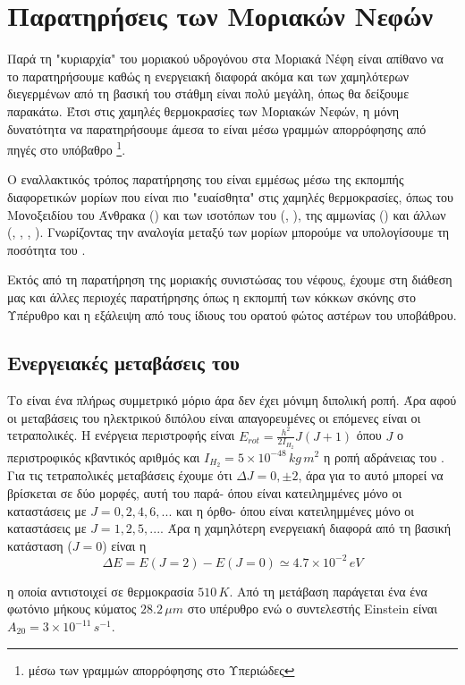 \documentclass[a4paper,11pt]{memoir}
\begin{document}
\section{Παρατηρήσεις των Μοριακών Νεφών}
\label{par:H2}
Παρά τη "κυριαρχία" του μοριακού υδρογόνου στα Μοριακά Νέφη είναι απίθανο να το παρατηρήσουμε καθώς η ενεργειακή διαφορά ακόμα και των χαμηλότερων διεγερμένων από τη βασική του στάθμη είναι πολύ μεγάλη, όπως θα δείξουμε παρακάτω. Έτσι στις χαμηλές θερμοκρασίες των Μοριακών Νεφών, η μόνη δυνατότητα να παρατηρήσουμε άμεσα το  είναι μέσω γραμμών απορρόφησης από πηγές στο υπόβαθρο \footnote{μέσω των γραμμών απορρόφησης στο Υπεριώδες}. 

Ο εναλλακτικός τρόπος παρατήρησης του  είναι εμμέσως μέσω της εκπομπής διαφορετικών μορίων που είναι πιο "ευαίσθητα" στις χαμηλές θερμοκρασίες, όπως του Μονοξειδίου του Άνθρακα () και των ισοτόπων του (, ), της αμμωνίας () και άλλων (, , , ).
Γνωρίζοντας την αναλογία μεταξύ των μορίων μπορούμε να υπολογίσουμε τη ποσότητα του .

Εκτός από τη παρατήρηση της μοριακής συνιστώσας του νέφους, έχουμε στη διάθεση μας και άλλες περιοχές παρατήρησης όπως η εκπομπή των κόκκων σκόνης στο Υπέρυθρο και η εξάλειψη από τους ίδιους του ορατού φώτος αστέρων του υποβάθρου.

\subsection{Ενεργειακές μεταβάσεις του }
Το  είναι ένα πλήρως συμμετρικό μόριο άρα δεν έχει μόνιμη διπολική ροπή. Άρα αφού οι μεταβάσεις του ηλεκτρικού διπόλου είναι απαγορευμένες οι επόμενες είναι οι τετραπολικές. 
Η ενέργεια περιστροφής είναι $E_{rot}=\frac{h^2}{2I_{H_2}}J(J+1)$ όπου $J$ ο περιστροφικός κβαντικός αριθμός και $I_{H_2}=5\times 10^{-48} \, kg\, m^2$ η ροπή αδράνειας του .
Για τις τετραπολικές μεταβάσεις έχουμε ότι $\Delta J =0,\pm 2$, άρα για το  αυτό μπορεί να βρίσκεται σε δύο μορφές, αυτή του παρά- όπου είναι κατειλημμένες μόνο οι καταστάσεις με $J=0,2,4,6,...$ και η όρθο- όπου είναι κατειλημμένες μόνο οι καταστάσεις με $J=1,2,5,...$. 
Άρα η χαμηλότερη ενεργειακή διαφορά από τη βασική κατάσταση ($J=0$) είναι η 
\begin{equation}
\Delta E=E(J=2)-E(J=0)\simeq 4.7\times 10^{-2}\, eV
\end{equation}

η οποία αντιστοιχεί σε θερμοκρασία $510 \,K$. Από τη μετάβαση παράγεται ένα ένα φωτόνιο μήκους κύματος $28.2\, \mu m$ στο υπέρυθρο ενώ ο συντελεστής Einstein είναι $A_{20}=3\times 10^{-11} \, s^{-1}$.
\end{document}
